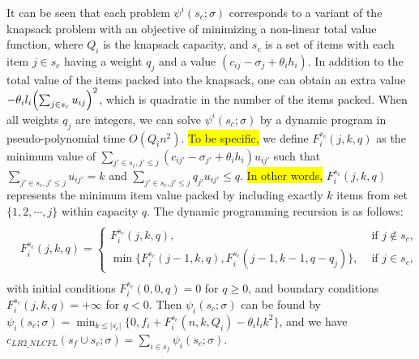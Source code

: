 \documentclass[ijoc,nonblindrev]{informs3} %
\begin{document}
It can be seen that each problem $\psi^i(s_c;\sigma)$ corresponds to a variant of the knapsack problem with an objective of minimizing a non-linear total value function, where $Q_i$ is the knapsack capacity, and $s_c$ is a set of items with each item $j\in s_c$ having a weight $q_j$ and a value $(c_{ij}-\sigma_j+\theta_ih_i)$.
In addition to the total value of the items packed into the knapsack, one can obtain an extra value $-\theta_il_i \Bigl( \sum_{j \in s_c}u_{ij}\Bigr)^2$, which is quadratic in the number of the items packed. When all weights $q_j$ are integers, we can solve $\psi^i(s_c;\sigma)$ by a dynamic program in pseudo-polynomial time $O(Q_in^2)$. 
\colorbox{yellow}{To be specific,} we define $F^{s_c}_i(j,k,q)$ as the minimum value of $\sum_{j'\in s_c,j'\leq j}(c_{ij'}-\sigma_{j'}+\theta_ih_i)u_{ij'}$ such that $\sum_{j'\in s_c,j'\leq j}u_{ij'}=k$ and $\sum_{j'\in s_c,j'\leq j}q_{j'}u_{ij'}\leq q$. 
\colorbox{yellow}{In other words,} $F^{s_c}_i(j,k,q)$ represents the minimum item value packed by including exactly $k$ items from set $\{1,2,\cdots,j\}$ within capacity $q$.
The dynamic programming recursion is as follows:
\begin{eqnarray*}
\begin{aligned}
\begin{split}
F^{s_c}_i(j,k,q)=\left\{
\begin{array}{ll}
F^{s_c}_i(j,k,q), & \mbox{ if } j\not\in s_c,
\\[3mm]
\min\big\{F^{s_c}_i(j-1,k,q),F^{s_c}_i(j-1,k-1,q-q_j) \big\}, & \mbox{ if } j\in s_c, 
\end{array}\right.
\end{split}
\end{aligned}
\end{eqnarray*}
with initial conditions $F^{s_c}_i(0,0,q)=0$ for  $q\geq 0$, and boundary conditions $F^{s_c}_i(j,k,q)=+\infty$ for $q<0$. Then $\psi_i(s_c;\sigma)$ can be found by $\psi_i(s_c;\sigma) = \min_{k\leq |s_c|}\bigl\{ 0, f_i+F^{s_c}_i(n,k,Q_i)-\theta_i l_i k^2\bigr\}$, and we have $c_{LR2\_NLCFL}(s_f \cup s_c;\sigma) = \sum_{i \in s_f} \psi_i(s_c;\sigma)$.




\end{document}
